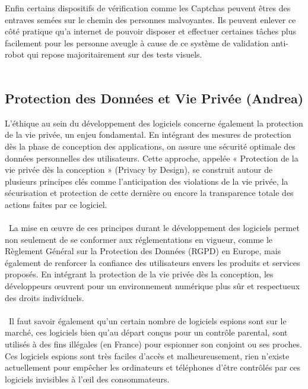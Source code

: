 \documentclass{article}
\begin{document}
Enfin certains dispositifs de vérification comme les Captchas \cite{Wagner_2022b} peuvent êtres des entraves semées sur le chemin des personnes malvoyantes. Ils peuvent enlever ce côté pratique qu’a internet de pouvoir disposer et effectuer certaines tâches plus facilement pour les personne aveugle à cause de ce système de validation anti-robot qui repose majoritairement sur des tests visuels. \\\\

\subsection{Protection des Données et Vie Privée (Andrea)}

L’éthique au sein du développement des logiciels concerne également la protection de la vie privée, un enjeu fondamental. En intégrant des mesures de protection dès la phase de conception des applications, on assure une sécurité optimale des données personnelles des utilisateurs. Cette approche, appelée « Protection de la vie privée dès la conception » (Privacy by Design), se construit autour de plusieurs principes clés comme l’anticipation des violations de la vie privée, la sécurisation et protection de cette dernière ou encore la transparence totale des actions faites par ce logiciel.
\\\\
 La mise en œuvre de ces principes durant le développement des logiciels permet non seulement de se conformer aux réglementations en vigueur, comme le Règlement Général sur la Protection des Données (RGPD) en Europe, mais également de renforcer la confiance des utilisateurs envers les produits et services proposés. En intégrant la protection de la vie privée dès la conception, les développeurs œuvrent pour un environnement numérique plus sûr et respectueux des droits individuels.
\\\\
 Il faut savoir également qu’un certain nombre de logiciels espions sont sur le marché, ces logiciels bien qu’au départ conçus pour un contrôle parental, sont utilisés à des fins illégales (en France) pour espionner son conjoint ou ses proches. Ces logiciels espions sont très faciles d’accès et malheureusement, rien n’existe actuellement pour empêcher les ordinateurs et téléphones d’être contrôlés par ces logiciels invisibles à l’œil des consommateurs.
\\\\
\end{document}
